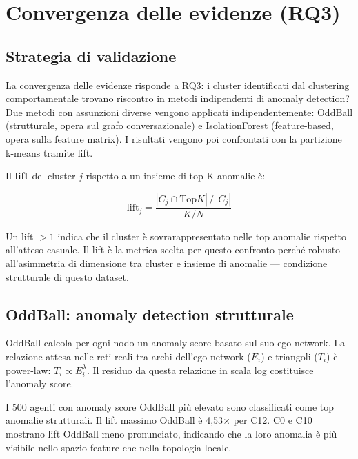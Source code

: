 \documentclass[12pt,a4paper]{report}
\begin{document}
\chapter{Convergenza delle evidenze (RQ3)}

\section{Strategia di validazione}

La convergenza delle evidenze risponde a RQ3: i cluster identificati dal clustering comportamentale trovano riscontro in metodi indipendenti di anomaly detection? Due metodi con assunzioni diverse vengono applicati indipendentemente: OddBall (strutturale, opera sul grafo conversazionale) e IsolationForest (feature-based, opera sulla feature matrix). I risultati vengono poi confrontati con la partizione k-means tramite lift.

Il \textbf{lift} del cluster $j$ rispetto a un insieme di top-K anomalie è:

\begin{equation}
\text{lift}_j = \frac{|C_j \cap \text{Top}K| \,/\, |C_j|}{K / N}
\label{eq:lift}
\end{equation}

Un lift $> 1$ indica che il cluster è sovrarappresentato nelle top anomalie rispetto all'atteso casuale. Il lift è la metrica scelta per questo confronto perché robusto all'asimmetria di dimensione tra cluster e insieme di anomalie — condizione strutturale di questo dataset.

\section{OddBall: anomaly detection strutturale}

OddBall \citep{akoglu2010} calcola per ogni nodo un anomaly score basato sul suo ego-network. La relazione attesa nelle reti reali tra archi dell'ego-network ($E_i$) e triangoli ($T_i$) è power-law: $T_i \propto E_i^{\lambda}$. Il residuo da questa relazione in scala log costituisce l'anomaly score.

I 500 agenti con anomaly score OddBall più elevato sono classificati come top anomalie strutturali. Il lift massimo OddBall è 4,53$\times$ per C12. C0 e C10 mostrano lift OddBall meno pronunciato, indicando che la loro anomalia è più visibile nello spazio feature che nella topologia locale.
\end{document}
